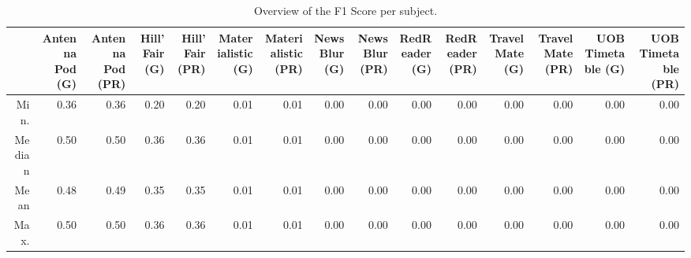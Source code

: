 \begin{table}[ht]
\centering
\begin{tabular}{rrrrrrrrrrrrrrr}
  \hline
 & Antenna Pod (G) & Antenna Pod (PR) & Hill'Fair (G) & Hill'Fair (PR) & Materialistic (G) & Materialistic (PR) & NewsBlur (G) & NewsBlur (PR) & RedReader (G) & RedReader (PR) & Travel Mate (G) & Travel Mate (PR) & UOB Timetable (G) & UOB Timetable (PR) \\ 
  \hline
Min. & 0.36 & 0.36 & 0.20 & 0.20 & 0.01 & 0.01 & 0.00 & 0.00 & 0.00 & 0.00 & 0.00 & 0.00 & 0.00 & 0.00 \\ 
  Median & 0.50 & 0.50 & 0.36 & 0.36 & 0.01 & 0.01 & 0.00 & 0.00 & 0.00 & 0.00 & 0.00 & 0.00 & 0.00 & 0.00 \\ 
  Mean & 0.48 & 0.49 & 0.35 & 0.35 & 0.01 & 0.01 & 0.00 & 0.00 & 0.00 & 0.00 & 0.00 & 0.00 & 0.00 & 0.00 \\ 
  Max. & 0.50 & 0.50 & 0.36 & 0.36 & 0.01 & 0.01 & 0.00 & 0.00 & 0.00 & 0.00 & 0.00 & 0.00 & 0.00 & 0.00 \\ 
   \hline
\end{tabular}
\caption{Overview of the F1 Score per subject.} 
\label{tab:results:rq3:summary:subject:f1_score}
\end{table}
